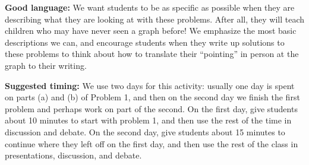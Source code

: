 \documentclass[nooutcomes,noauthor,handout]{ximera}
\begin{document}
\begin{instructorNotes}
{\bf Good language:} We want students to be as specific as possible when they are describing what they are looking at with these problems. After all, they will teach children who may have never seen a graph before! We emphasize the most basic descriptions we can, and encourage students when they write up solutions to these problems to think about how to translate their ``pointing'' in person at the graph to their writing.



{\bf Suggested timing:} We use two days for this activity: usually one day is spent on parts (a) and (b) of Problem 1, and then on the second day we finish the first problem and perhaps work on part of the second. On the first day, give students about 10 minutes to start with problem 1, and then use the rest of the time in discussion and debate. On the second day, give students about 15 minutes to continue where they left off on the first day, and then use the rest of the class in presentations, discussion, and debate.


\end{instructorNotes}
\end{document}
